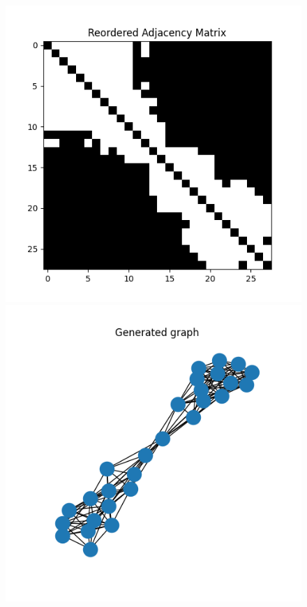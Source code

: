 \documentclass[a4paper]{article}
\begin{document}
\begin{figure}[ht!]
    \begin{minipage}{.45\textwidth}
      \includegraphics[width=0.7\linewidth]{figures/graph_04_adjacency_matrix.png}
    \end{minipage}\hfill
    \begin{minipage}{.45\textwidth}
      \includegraphics[width=0.7\linewidth]{figures/graph_04_generated_graph.png}
    \end{minipage}

\end{figure}
\end{document}
